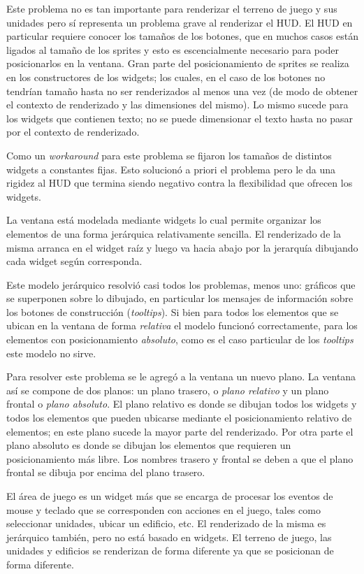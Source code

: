 \documentclass[titlepage,a4paper,12pt]{article}
\begin{document}
Este problema no es tan importante para renderizar el terreno de juego y sus unidades pero sí representa un problema grave al renderizar el HUD. El HUD en particular requiere conocer los tamaños de los botones, que en muchos casos están ligados al tamaño de los sprites y esto es escencialmente necesario para poder posicionarlos en la ventana. Gran parte del posicionamiento de sprites se realiza en los constructores de los widgets; los cuales, en el caso de los botones no tendrían tamaño hasta no ser renderizados al menos una vez (de modo de obtener el contexto de renderizado y las dimensiones del mismo). Lo mismo sucede para los widgets que contienen texto; no se puede dimensionar el texto hasta no pasar por el contexto de renderizado.

Como un \textit{workaround} para este problema se fijaron los tamaños de distintos widgets a constantes fijas. Esto solucionó a priori el problema pero le da una rigidez al HUD que termina siendo negativo contra la flexibilidad que ofrecen los widgets.

La ventana está modelada mediante widgets lo cual permite organizar los elementos de una forma jerárquica relativamente sencilla. El renderizado de la misma arranca en el widget raíz y luego va hacia abajo por la jerarquía dibujando cada widget según corresponda. 

Este modelo jerárquico resolvió casi todos los problemas, menos uno: gráficos que se superponen sobre lo dibujado, en particular los mensajes de información sobre los botones de construcción (\textit{tooltips}). Si bien para todos los elementos que se ubican en la ventana de forma \textit{relativa} el modelo funcionó correctamente, para los elementos con posicionamiento \textit{absoluto}, como es el caso particular de los \textit{tooltips} este modelo no sirve. 

Para resolver este problema se le agregó a la ventana un nuevo plano. La ventana así se compone de dos planos: un plano trasero, o \textit{plano relativo} y un plano frontal o \textit{plano absoluto}. El plano relativo es donde se dibujan todos los widgets y todos los elementos que pueden ubicarse mediante el posicionamiento relativo de elementos; en este plano sucede la mayor parte del renderizado. Por otra parte el plano absoluto es donde se dibujan los elementos que requieren un posicionamiento más libre.
Los nombres trasero y frontal se deben a que el plano frontal se dibuja por encima del plano trasero.

El área de juego es un widget más que se encarga de procesar los eventos de mouse y teclado que se corresponden con acciones en el juego, tales como seleccionar unidades, ubicar un edificio, etc. 
El renderizado de la misma es jerárquico también, pero no está basado en widgets. El terreno de juego, las unidades y edificios se renderizan de forma diferente ya que se posicionan de forma diferente.
\end{document}
